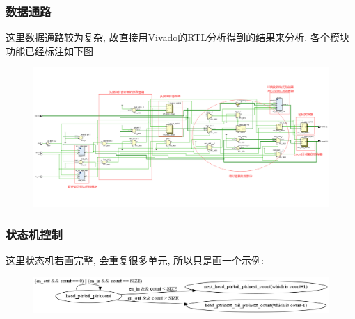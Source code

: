 \documentclass[UTF8]{article}
\begin{document}
\subsubsection{数据通路}
这里数据通路较为复杂, 故直接用Vivado的RTL分析得到的结果来分析. 各个模块功能已经标注如下图
\begin{figure}[H]
	\centering
	\includegraphics[scale=0.3]{data_path.png}
\end{figure}\par
\subsubsection{状态机控制}
这里状态机若画完整, 会重复很多单元, 所以只是画一个示例:
\begin{figure}[H]
	\centering
	\includegraphics[scale=0.45]{graph.png}
\end{figure}\par
\end{document}
